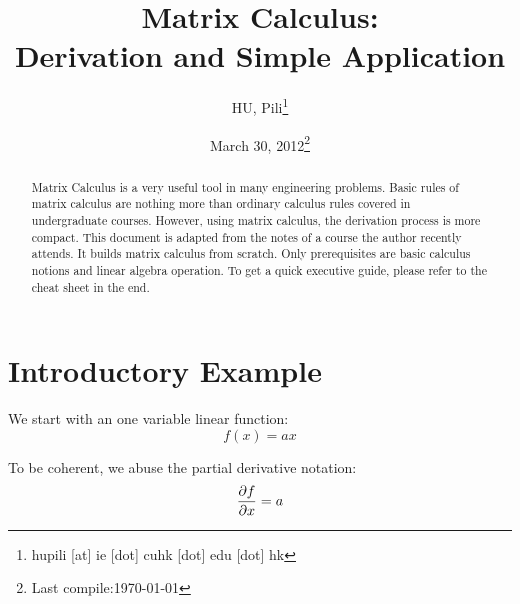 


\author{HU, Pili\thanks{hupili [at] ie [dot] cuhk [dot] edu [dot] hk}}

\title{Matrix Calculus: \\ Derivation and Simple Application}
\date{March 30, 2012\thanks{Last compile:\today}}



\maketitle
\begin{abstract}
	Matrix Calculus\cite{wiki_mc} is a very useful tool in many 
	engineering problems. Basic rules of matrix calculus are 
	nothing more than ordinary calculus rules covered in 
	undergraduate courses. However, using matrix calculus, 
	the derivation process is more compact. This document is 
	adapted from the notes of a course the author recently attends.
	It builds matrix calculus from scratch. Only prerequisites 
	are basic calculus notions and linear algebra operation.  
	To get a quick executive guide, please refer to the cheat 
	sheet in the end. 
\end{abstract}

\pagebreak
\tableofcontents
\pagebreak



\section{Introductory Example}

We start with an one variable linear function:
\begin{equation}
	f(x) = ax
\end{equation}

To be coherent, we abuse the partial derivative notation:
\begin{equation}
	\dfrac{\partial f}{\partial x} = a
	\label{eq:fax-single}
\end{equation}

